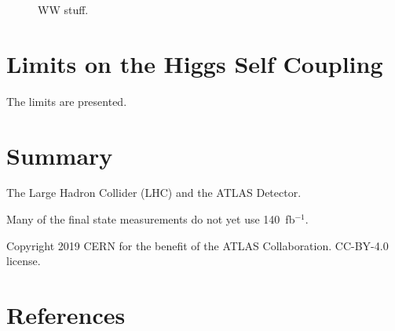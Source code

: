\documentclass{moriond}
\begin{document}
\begin{figure}[!htbp]
  \centering
  \caption{
    WW stuff.
  }
  \label{fig:vh_bb}
\end{figure}

\section{Limits on the Higgs Self Coupling} \label{sec:hh}

The limits are presented.

\section{Summary}

The Large Hadron Collider (LHC) \cite{Evans:2008zzb} and the ATLAS Detector.

Many of the final state measurements do not yet use 140~fb$^{-1}$.

Copyright 2019 CERN for the benefit of the ATLAS Collaboration. CC-BY-4.0 license.

\section*{References}


\end{document}
